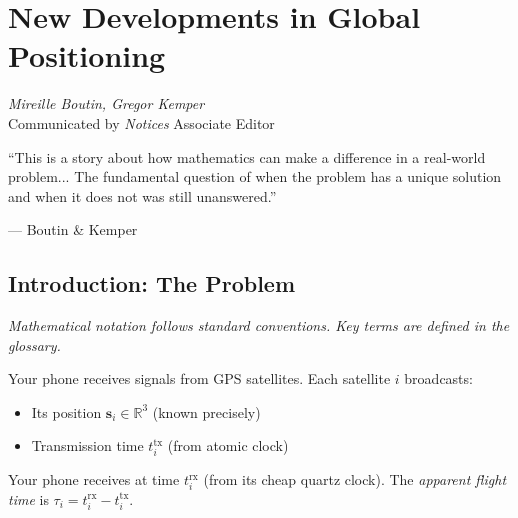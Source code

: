 \chapter{New Developments in Global Positioning}
\label{ch:gps}

\begin{flushright}
\textit{Mireille Boutin, Gregor Kemper}\\
Communicated by \textit{Notices} Associate Editor
\end{flushright}

\epigraph{``This is a story about how mathematics can make a difference in a real-world problem... The fundamental question of when the problem has a unique solution and when it does not was still unanswered.''}{--- Boutin \& Kemper}

\begin{abstract}
The Global Positioning System (GPS) solves a system of quadratic equations every time your phone finds its location. This chapter shows how algebraic geometry and Minkowski geometry reveal the exact conditions for unique solvability: the satellite positions must not lie on a quadric with the user position as focus. The solution is a linear algebra problem in disguise, \cite{boutin2025gps}.
\end{abstract}

\section{Introduction: The Problem}

\noindent\textit{Mathematical notation follows standard conventions. Key terms are defined in the glossary.}\n
\label{sec:gps:intro}

Your phone receives signals from GPS satellites. Each satellite $i$ broadcasts: \cite{boutin2025gps}
\begin{itemize}
    \item Its position $\bm{s}_i \in \mathbb{R}^3$ (known precisely)
    \item Transmission time $t_i^{\text{tx}}$ (from atomic clock)
\end{itemize}
Your phone receives at time $t_i^{\text{rx}}$ (from its cheap quartz clock). The \emph{apparent flight time} is $\tau_i = t_i^{\text{rx}} - t_i^{\text{tx}}$.

